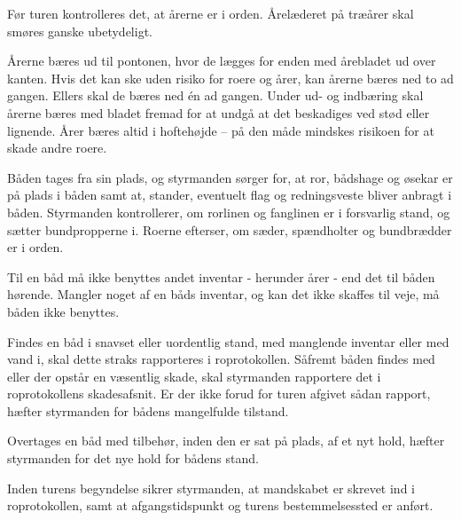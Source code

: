 \documentclass{article}
\begin{document}
Før turen kontrolleres det, at årerne er i orden. Årelæderet på træårer
skal smøres ganske ubetydeligt.

Årerne bæres ud til pontonen, hvor de lægges for enden med årebladet ud
over kanten. Hvis det kan ske uden risiko for roere og årer, kan årerne
bæres ned to ad gangen. Ellers skal de bæres ned én ad gangen. Under ud-
og indbæring skal årerne bæres med bladet fremad for at undgå at det
beskadiges ved stød eller lignende.  Årer bæres altid i hoftehøjde – på
den måde mindskes risikoen for at skade andre roere.

Båden tages fra sin plads, og styrmanden sørger for, at ror, bådshage og
øsekar er på plads i båden samt at, stander, eventuelt flag og
redningsveste bliver anbragt i båden. Styrmanden kontrollerer, om
rorlinen og fanglinen er i forsvarlig stand, og sætter bundpropperne i.
Roerne efterser, om sæder, spændholter og bundbrædder er i orden.

Til en båd må ikke benyttes andet inventar - herunder årer - end det til
båden hørende. Mangler noget af en båds inventar, og kan det ikke skaffes
til veje, må båden ikke benyttes.

Findes en båd i snavset eller uordentlig stand, med manglende inventar
eller med vand i, skal dette straks rapporteres i roprotokollen. Såfremt
båden findes med eller der opstår en væsentlig skade, skal styrmanden
rapportere det i roprotokollens skadesafsnit. Er der ikke forud for turen
afgivet sådan rapport, hæfter styrmanden for bådens mangelfulde tilstand.

Overtages en båd med tilbehør, inden den er sat på plads, af et nyt hold,
hæfter styrmanden for det nye hold for bådens stand.

Inden turens begyndelse sikrer styrmanden, at mandskabet er skrevet ind i
roprotokollen, samt at afgangstidspunkt og turens bestemmelsessted er
anført.
\end{document}
